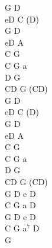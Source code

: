 \documentclass[a5paper, 10pt]{book}
\begin{document}
\begin{minipage}[t]{0.2\textwidth}
  G D\\
  eD C (D)\\
  G D\\
  eD A\\

  C G\\
  C G a\\
  D G\\
  CD G (CD)\\

  G D\\
  eD C (D)\\
  G D\\
  eD A\\

  C G\\
  C G a\\
  D G\\
  CD G (CD)\\

  G D e D\\
  C G a D\\
  G D e D\\
  C G a$^7$ D\\
  G\\
\end{minipage}

\newpage
\end{document}
